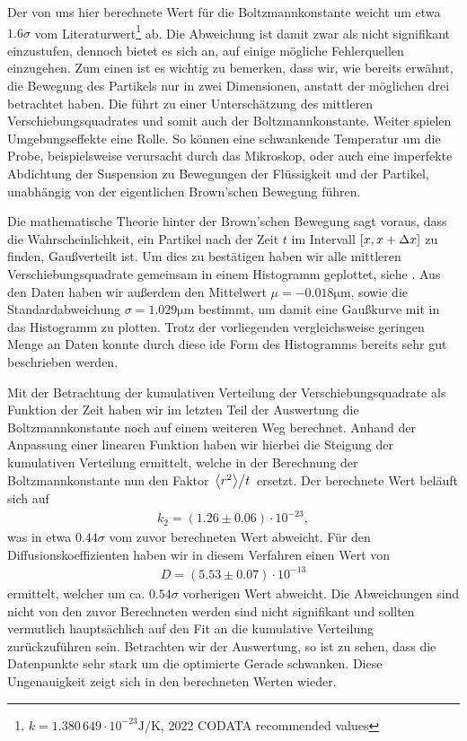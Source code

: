 Der von uns hier berechnete Wert für die Boltzmannkonstante weicht um etwa $1.6\sigma$ vom Literaturwert\footnote{$k = 1.380\,649 \cdot 10^{-23}\si{\joule\per\kelvin}$, 2022 CODATA recommended values} ab. Die Abweichung ist damit zwar als nicht signifikant einzustufen, dennoch bietet es sich an, auf einige mögliche Fehlerquellen einzugehen. Zum einen ist es wichtig zu bemerken, dass wir, wie bereits erwähnt, die Bewegung des Partikels nur in zwei Dimensionen, anstatt der möglichen drei betrachtet haben. Die führt zu einer Unterschätzung des mittleren Verschiebungsquadrates und somit auch der Boltzmannkonstante. Weiter spielen Umgebungseffekte eine Rolle. So können eine schwankende Temperatur um die Probe, beispielsweise verursacht durch das Mikroskop, oder auch eine imperfekte Abdichtung der Suspension zu Bewegungen der Flüssigkeit und der Partikel, unabhängig von der eigentlichen Brown'schen Bewegung führen.

Die mathematische Theorie hinter der Brown'schen Bewegung sagt voraus, dass die Wahrscheinlichkeit, ein Partikel nach der Zeit $t$ im Intervall $\qty[x, x + \Delta x]$ zu finden, Gaußverteilt ist. Um dies zu bestätigen haben wir alle mittleren Verschiebungsquadrate gemeinsam in einem Histogramm geplottet, siehe . Aus den Daten haben wir außerdem den Mittelwert $\mu = -0.018\si{\micro\meter}$, sowie die Standardabweichung $\sigma = 1.029 \si{\micro\meter}$ bestimmt, um damit eine Gaußkurve mit in das Histogramm zu plotten. Trotz der vorliegenden vergleichsweise geringen Menge an Daten konnte durch diese ide Form des Histogramms bereits sehr gut beschrieben werden.

Mit der Betrachtung der kumulativen Verteilung der Verschiebungsquadrate als Funktion der Zeit haben wir im letzten Teil der Auswertung die Boltzmannkonstante noch auf einem weiteren Weg berechnet. Anhand der Anpassung einer linearen Funktion haben wir hierbei die Steigung der kumulativen Verteilung ermittelt, welche in der Berechnung der Boltzmannkonstante nun den Faktor $\flatfrac{\expval{r^2}}{t}$ ersetzt. Der berechnete Wert beläuft sich auf
\begin{align*}
  k_{2} = (1.26 \pm 0.06) \cdot 10^{-23},
\end{align*}
was in etwa $0.44\sigma$ vom zuvor berechneten Wert abweicht. Für den Diffusionskoeffizienten haben wir in diesem Verfahren einen Wert von
\begin{align*}
  D = (5.53 \pm 0.07) \cdot 10^{-13}
\end{align*}
ermittelt, welcher um ca. $0.54\sigma$ vorherigen Wert abweicht. Die Abweichungen sind nicht von den zuvor Berechneten werden sind nicht signifikant und sollten vermutlich hauptsächlich auf den Fit an die kumulative Verteilung zurückzuführen sein. Betrachten wir  der Auswertung, so ist zu sehen, dass die Datenpunkte sehr stark um die optimierte Gerade schwanken. Diese Ungenauigkeit zeigt sich in den berechneten Werten wieder.